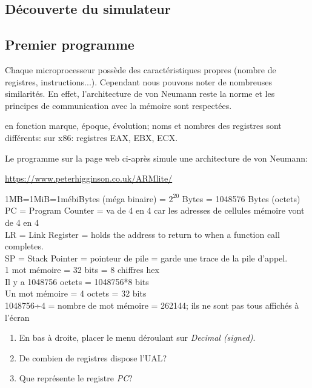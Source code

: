 \documentclass[a4paper,11pt]{article}
\begin{document}
\begin{Form}
\section{Découverte du simulateur}
\subsection{Premier programme}
Chaque microprocesseur possède des caractéristiques propres (nombre de registres, instructions...). Cependant nous pouvons noter de nombreuses similarités. En effet, l'architecture de von Neumann reste la norme et les principes de communication avec la mémoire sont respectées.\\
\begin{commentprof}
en fonction marque, époque, évolution; noms et nombres des registres sont différents: sur x86: registres EAX, EBX, ECX.
\end{commentprof}
Le programme sur la page web ci-après simule une architecture de von Neumann:
\begin{center}
\url{https://www.peterhigginson.co.uk/ARMlite/}
\end{center}
\begin{commentprof}
\noindent 1MB=1MiB=1mébiBytes (méga binaire) = $2^{20}$ Bytes = 1048576 Bytes (octets)\\ PC = Program Counter = va de 4 en 4 car les adresses de cellules mémoire vont de 4 en 4\\LR = Link Register = holds the address to return to when a function call completes.\\SP = Stack Pointer = pointeur de pile = garde une trace de la pile d'appel.\\1 mot mémoire = 32 bits = 8 chiffres hex\\Il y a 1048756 octets = 1048756*8 bits\\Un mot mémoire = 4 octets = 32 bits\\1048756÷4 = nombre de mot mémoire = 262144; ils ne sont pas tous affichés à l'écran
\end{commentprof}
\begin{activite}
\begin{enumerate}
\item En bas à droite, placer le menu déroulant sur \emph{Decimal (signed)}.
\item De combien de registres dispose l'UAL?
\item Que représente le registre \emph{PC}?

\end{enumerate}
\end{activite}
\end{Form}
\end{document}
